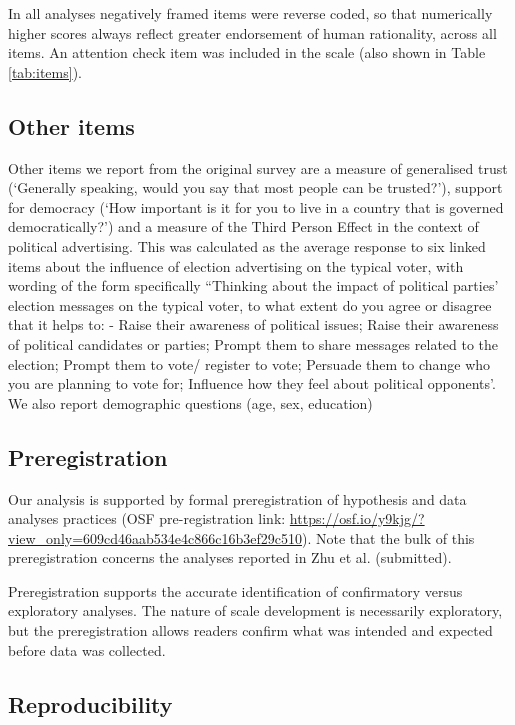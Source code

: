 \documentclass[
  ,jou,floatsintext]{apa6}
\begin{document}
In all analyses negatively framed items were reverse coded, so that numerically higher scores always reflect greater endorsement of human rationality, across all items. An attention check item was included in the scale (also shown in Table \ref{tab:items}).

\hypertarget{other-items}{%
\subsection{Other items}\label{other-items}}

Other items we report from the original survey are a measure of generalised trust (`Generally speaking, would you say that most people can be trusted?'), support for democracy (`How important is it for you to live in a country that is governed democratically?') and a measure of the Third Person Effect in the context of political advertising. This was calculated as the average response to six linked items about the influence of election advertising on the typical voter, with wording of the form specifically ``Thinking about the impact of political parties' election messages on the typical voter, to what extent do you agree or disagree that it helps to: - Raise their awareness of political issues; Raise their awareness of political candidates or parties; Prompt them to share messages related to the election; Prompt them to vote/ register to vote; Persuade them to change who you are planning to vote for; Influence how they feel about political opponents'. We also report demographic questions (age, sex, education)

\hypertarget{preregistration}{%
\subsection{Preregistration}\label{preregistration}}

Our analysis is supported by formal preregistration of hypothesis and data analyses practices
(OSF pre-registration link: \url{https://osf.io/y9kjg/?view_only=609cd46aab534e4c866c16b3ef29c510}). Note that the bulk of this preregistration concerns the analyses reported in Zhu et al. (submitted).

Preregistration supports the accurate identification of confirmatory versus exploratory analyses. The nature of scale development is necessarily exploratory, but the preregistration allows readers confirm what was intended and expected before data was collected.

\hypertarget{reproducibility}{%
\subsection{Reproducibility}\label{reproducibility}}
\end{document}
